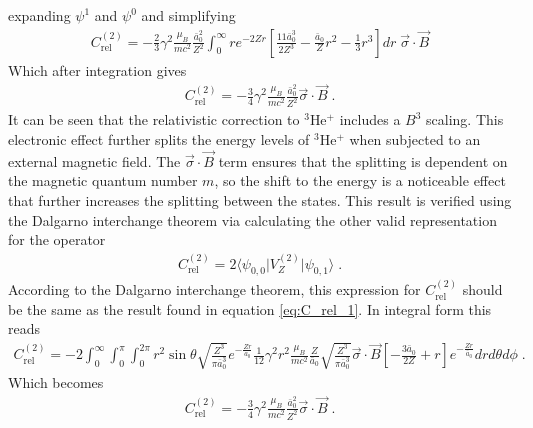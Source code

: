             \noindent expanding $\psi^1$ and $\psi^0$ and simplifying
            \begin{align}
                C_{\text{rel}}^{(2)} = -\frac{2}{3} \gamma^2 \frac{\mu_B}{mc^2}\frac{\bar{a}_0^2}{Z^2} \int_0^\infty r e^{-2Zr} \left[ \frac{11 \bar{a}_0^3}{2Z^3} - \frac{\bar{a}_0}{Z}r^2 - \frac{1}{3} r^3 \right] dr \; \vec{\sigma} \cdot \vec{B}
            \end{align}
            \normalsize
            \noindent Which after integration gives 
            \begin{align}
                C_{\text{rel}}^{(2)} = -\frac{3}{4} \gamma^2 \frac{\mu_B}{mc^2} \frac{\bar{a}_0^2}{Z^2} \vec{\sigma} \cdot \vec{B} \;. \label{eq:C_rel_1}
            \end{align}
            \noindent It can be seen that the relativistic correction to $^3$He$^+$ includes a $B^3$ scaling. This electronic effect further splits the energy levels of $^3$He$^+$ when subjected to an external magnetic field. The $\vec{\sigma} \cdot \vec{B}$ term ensures that the splitting is dependent on the magnetic quantum number $m$, so the shift to the energy is a noticeable effect that further increases the splitting between the states. This result is verified using the Dalgarno interchange theorem via calculating the other valid representation for the operator
            \begin{align}
                C_{\text{rel}}^{(2)} = 2\langle \psi_{0,0} \vert V_{Z}^{(2)} \vert \psi_{0,1}\rangle\;.
            \end{align}
            According to the Dalgarno interchange theorem, this expression for $C_{\text{rel}}^{(2)}$ should be the same as the result found in equation \eqref{eq:C_rel_1}. In integral form this reads 
            \footnotesize
            \begin{align}
                C_{\text{rel}}^{(2)} = -2\int_0^\infty \int_0^\pi \int_0^{2\pi} r^2 \sin\theta \sqrt{\frac{Z^3}{\pi \bar{a}_0^3}}e^{-\frac{Zr}{a_0}} \frac{1}{12} \gamma^2 r^2 \frac{\mu_B}{mc^2}\frac{Z}{\bar{a}_0}\sqrt{\frac{Z^3}{\pi \bar{a}_0^3}} \vec{\sigma} \cdot \vec{B} \left[ - \frac{3\bar{a}_0}{2Z} + r \right] e^{-\frac{Zr}{\bar{a}_0}}dr d\theta d\phi\;.
            \end{align}
            \normalsize Which becomes
            \begin{align}
                C_{\text{rel}}^{(2)} = -\frac{3}{4} \gamma^2 \frac{\mu_B}{mc^2} \frac{\bar{a}_0^2}{Z^2} \vec{\sigma} \cdot \vec{B} \;. \label{eq:C_rel_2}
            \end{align}
